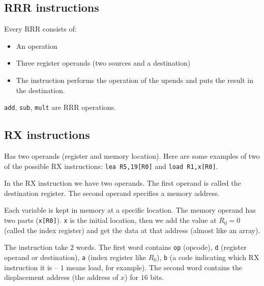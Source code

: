\subsection{RRR instructions}\label{sub:rrr_instructions}

Every RRR consists of:
\begin{itemize}
	\item An operation
	\item Three register operands (two sources and a destination)
	\item The instruction performs the operation of the upends and puts the result in the destination.
\end{itemize}

\texttt{add}, \texttt{sub}, \texttt{mult} are RRR operations.

\subsection{RX instructions}\label{sub:rx_instructions}

Has two operands (register and memory location).
Here are some examples of two of the possible RX instructions:
\texttt{lea R5,19[R0]} and \texttt{load R1,x[R0]}.

In the RX instruction we have two operands.
The first operand is called the destination register.
The second operand specifies a memory address.

Each variable is kept in memory at a specific location.
The memory operand has two parts (\texttt{x[R0]}).
\texttt{x} is the initial location, then we add the value at \(R_0 = 0\) (called the index register) and get the data at that address (almost like an array).

The instruction take \(2\) words.
The first word contains \texttt{op} (opcode), \texttt{d} (register operand or destination), \texttt{a} (index register like \(R_0\)), \texttt{b} (a code indicating which RX instruction it is -- \(1\) means load, for example).
The second word contains the displacement address (the address of \(x\)) for \(16\) bits.

